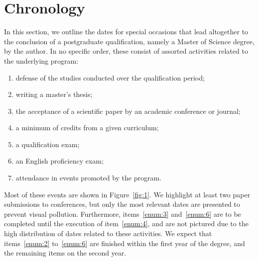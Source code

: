 \documentclass{article}
\title{}
\author{}
\date{}
\begin{document}
\section{Chronology}

In this section, we outline the dates for special occasions that lead altogether to the conclusion of a postgraduate qualification, namely a Master of Science degree, by the author. In no specific order, these consist of assorted activities related to the underlying program:

\begin{enumerate}[label=(\roman*)]
    \setlength\itemsep{1pt}
    \item\label{enum:0} defense of the studies conducted over the qualification period;
    \item\label{enum:1} writing a master's thesis;
    \item\label{enum:2} the acceptance of a scientific paper by an academic conference or journal;
    \item\label{enum:3} a minimum of credits from a given curriculum;
    \item\label{enum:4} a qualification exam;
    \item\label{enum:5} an English proficiency exam;
    \item\label{enum:6} attendance in events promoted by the program. 
\end{enumerate}

Most of these events are shown in Figure~\ref{fig:1}. We highlight at least two paper submissions to conferences, but only the most relevant dates are presented to prevent visual pollution. Furthermore, items~\ref{enum:3} and~\ref{enum:6} are to be completed until the execution of item~\ref{enum:4}, and are not pictured due to the high distribution of dates related to these activities. We expect that items~\ref{enum:2} to~\ref{enum:6} are finished within the first year of the degree, and the remaining items on the second year.
\end{document}
